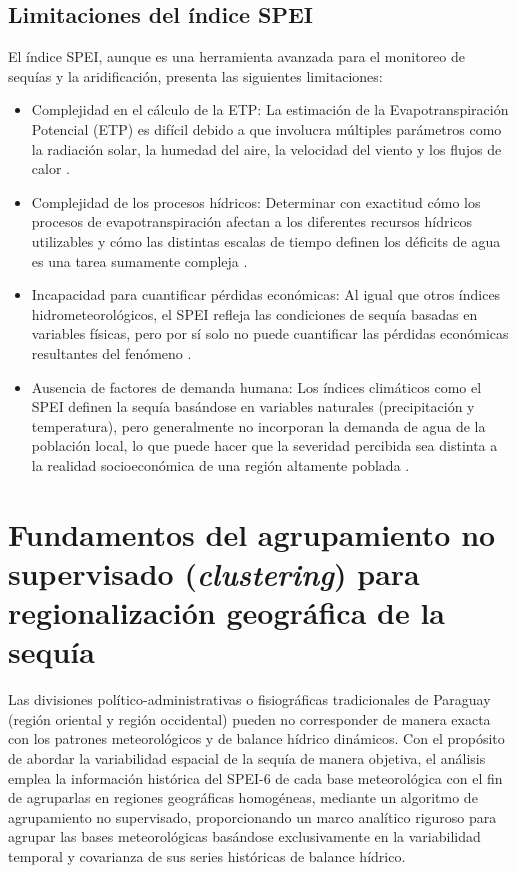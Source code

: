 \subsection{Limitaciones del índice SPEI}

El índice SPEI, aunque es una herramienta avanzada para el monitoreo de sequías y la aridificación, presenta las siguientes limitaciones:
\begin{itemize}
    \item {Complejidad en el cálculo de la ETP:} La estimación de la Evapotranspiración Potencial (ETP) es difícil debido a que involucra múltiples parámetros como la radiación solar, la humedad del aire, la velocidad del viento y los flujos de calor \cite{vicenteserrano2010}.
    \item {Complejidad de los procesos hídricos:} Determinar con exactitud cómo los procesos de evapotranspiración afectan a los diferentes recursos hídricos utilizables y cómo las distintas escalas de tiempo definen los déficits de agua es una tarea sumamente compleja \cite{vicenteserrano2010}.
    \item {Incapacidad para cuantificar pérdidas económicas:} Al igual que otros índices hidrometeorológicos, el SPEI refleja las condiciones de sequía basadas en variables físicas, pero por sí solo no puede cuantificar las pérdidas económicas resultantes del fenómeno \cite{mishra2010}.
    \item {Ausencia de factores de demanda humana:} Los índices climáticos como el SPEI definen la sequía basándose en variables naturales (precipitación y temperatura), pero generalmente no incorporan la demanda de agua de la población local, lo que puede hacer que la severidad percibida sea distinta a la realidad socioeconómica de una región altamente poblada \cite{mishra2010}.
\end{itemize}

\section{Fundamentos del agrupamiento no supervisado (\textit{clustering}) para regionalización geográfica de la sequía}

Las divisiones político-administrativas o fisiográficas tradicionales de Paraguay (región oriental y región occidental) pueden no corresponder de manera exacta con los patrones meteorológicos y de balance hídrico dinámicos. Con el propósito de abordar la variabilidad espacial de la sequía de manera objetiva, el análisis emplea la información histórica del SPEI-6 de cada base meteorológica con el fin de agruparlas en regiones geográficas homogéneas, mediante un algoritmo de agrupamiento no supervisado, proporcionando un marco analítico riguroso para agrupar las bases meteorológicas basándose exclusivamente en la variabilidad temporal y covarianza de sus series históricas de balance hídrico.

